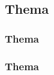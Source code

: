 \subsection{Thema}
\lipsum[1]
\subsubsection{Thema}
\lipsum[2-4]
\subsubsection{Thema}
\lipsum[5-7]
